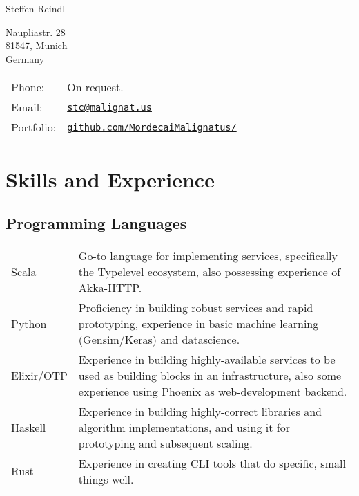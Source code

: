 \documentclass[a4paper]{article}
\def\name{Steffen Reindl}
\begin{document}
{\huge \name}
\vspace{0.25in}

\begin{minipage}{0.45\linewidth}
  Naupliastr. 28\\
  81547, Munich\\
  Germany
\end{minipage}
\begin{minipage}{0.45\linewidth}
  \begin{tabular}{ll}
    Phone: & On request. \\
    Email: & \href{mailto:stc@malignat.us}{\tt stc@malignat.us} \\
    Portfolio: & \href{https://github.com/MordecaiMalignatus/}{\tt github.com/MordecaiMalignatus/}
  \end{tabular}
\end{minipage}

\section*{Skills and Experience}

\subsection*{Programming Languages}
\begin{tabular}{ l p{14cm} }
Scala & Go-to language for implementing services, specifically the Typelevel ecosystem,
also \linebreak possessing experience of Akka-HTTP.\\
Python & Proficiency in building robust services and rapid prototyping,
experience in basic machine learning (Gensim/Keras) and datascience.\\
Elixir/OTP & Experience in building highly-available services to be used as
building blocks in an \linebreak infrastructure, also some experience using Phoenix as
web-development backend.\\
Haskell & Experience in building highly-correct libraries and algorithm
implementations, and using it for prototyping and subsequent scaling.\\
Rust & Experience in creating CLI tools that do specific, small things well. \\
\end{tabular}
\end{document}
